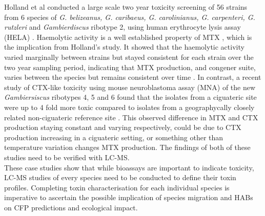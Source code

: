 \documentclass[12pt]{article}
\begin{document}
Holland et al conducted a large scale two year toxicity screening of 56 strains from 6 species of \emph{G. belizeanus, G. caribaeus, G. carolinianus, G. carpenteri, G. rutzleri} and  \emph{Gambierdiscus} ribotype 2, using human erythrocyte lysis assay (HELA) \cite{holland2013differences}. Haemolytic activity is a well established property of MTX \cite{igarashi1999mechanisms}, which is the implication from Holland's study. It showed that the haemolytic activity varied marginally between strains but stayed consistent for each strain over the two year sampling period, indicating that MTX production, and congener suite, varies between the species but remains consistent over time \cite{holland2013differences}.
In contrast, a recent study of CTX-like toxicity using mouse neuroblastoma assay (MNA) of the new \emph{Gambiersiscus} ribotypes 4, 5 and 6 found that the isolates from a ciguateric site were up to 4\- fold more toxic compared to isolates from a geographycally closely related non-ciguateric reference site \cite{xu2014distribution}. This observed difference in MTX and CTX production staying constant and varying respectively, could be due to CTX production increasing in a ciguateric setting, or something other than temperature variation changes MTX production. The findings of both of these studies need to be verified with LC-MS. \\
These case studies show that while bioassays are important to indicate toxicity, LC-MS studies of every species need to be conducted to define their toxin profiles. Completing toxin characterisation for each individual species is imperative to ascertain the possible implication of species migration and HABs on CFP predictions and ecological impact. 
\end{document}
